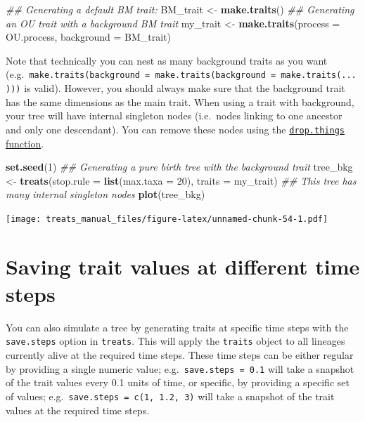 \documentclass[
]{book}
\newenvironment{Shaded}{\begin{snugshade}}{\end{snugshade}}
\newcommand{\CommentTok}[1]{\textcolor[rgb]{0.56,0.35,0.01}{\textit{#1}}}
\newcommand{\DataTypeTok}[1]{\textcolor[rgb]{0.13,0.29,0.53}{#1}}
\newcommand{\DecValTok}[1]{\textcolor[rgb]{0.00,0.00,0.81}{#1}}
\newcommand{\KeywordTok}[1]{\textcolor[rgb]{0.13,0.29,0.53}{\textbf{#1}}}
\newcommand{\NormalTok}[1]{#1}
\newcommand{\StringTok}[1]{\textcolor[rgb]{0.31,0.60,0.02}{#1}}
\begin{document}
\begin{Shaded}
\begin{Highlighting}[]
\CommentTok{\#\# Generating a default BM trait:}
\NormalTok{BM\_trait \textless{}{-}}\StringTok{ }\KeywordTok{make.traits}\NormalTok{()}
\CommentTok{\#\# Generating an OU trait with a background BM trait}
\NormalTok{my\_trait \textless{}{-}}\StringTok{ }\KeywordTok{make.traits}\NormalTok{(}\DataTypeTok{process =}\NormalTok{ OU.process, }\DataTypeTok{background =}\NormalTok{ BM\_trait) }
\end{Highlighting}
\end{Shaded}

Note that technically you can nest as many background traits as you want (e.g.~\texttt{make.traits(background\ =\ make.traits(background\ =\ make.traits(...)))} is valid).
However, you should always make sure that the background trait has the same dimensions as the main trait.
When using a trait with background, your tree will have internal singleton nodes (i.e.~nodes linking to one ancestor and only one descendant).
You can remove these nodes using the \protect\hyperlink{dropthings}{\texttt{drop.things} function}.

\begin{Shaded}
\begin{Highlighting}[]
\KeywordTok{set.seed}\NormalTok{(}\DecValTok{1}\NormalTok{)}
\CommentTok{\#\# Generating a pure birth tree with the background trait}
\NormalTok{tree\_bkg \textless{}{-}}\StringTok{ }\KeywordTok{treats}\NormalTok{(}\DataTypeTok{stop.rule =} \KeywordTok{list}\NormalTok{(}\DataTypeTok{max.taxa =} \DecValTok{20}\NormalTok{),}
                 \DataTypeTok{traits =}\NormalTok{ my\_trait)}
\CommentTok{\#\# This tree has many internal singleton nodes}
\KeywordTok{plot}\NormalTok{(tree\_bkg)}
\end{Highlighting}
\end{Shaded}

\texttt{[image: treats\_manual\_files/figure-latex/unnamed-chunk-54-1.pdf]}

\hypertarget{saving-trait-values-at-different-time-steps}{%
\section{Saving trait values at different time steps}\label{saving-trait-values-at-different-time-steps}}

You can also simulate a tree by generating traits at specific time steps with the \texttt{save.steps} option in \texttt{treats}.
This will apply the \texttt{traits} object to all lineages currently alive at the required time steps.
These time steps can be either regular by providing a single numeric value; e.g.~\texttt{save.steps\ =\ 0.1} will take a snapshot of the trait values every 0.1 units of time, or specific, by providing a specific set of values; e.g.~\texttt{save.steps\ =\ c(1,\ 1.2,\ 3)} will take a snapshot of the trait values at the required time steps.
\end{document}
